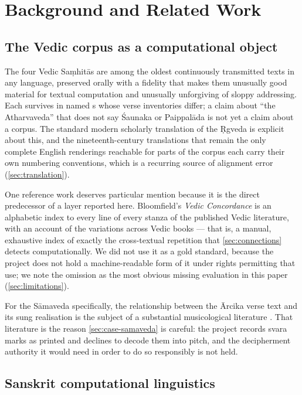 \section{Background and Related Work}
\label{sec:related}

\subsection{The Vedic corpus as a computational object}

The four Vedic Sa\d{m}hit\=as are among the oldest continuously transmitted texts in
any language, preserved orally with a fidelity that makes them unusually good
material for textual computation and unusually unforgiving of sloppy addressing. Each
survives in named s whose verse inventories differ; a claim about
``the Atharvaveda'' that does not say \'Saunaka or Paippal\=ada is not yet a claim
about a corpus. The standard modern scholarly translation of the \d{R}gveda
\citep{jamison2014rigveda} is explicit about this, and the nineteenth-century
translations that remain the only complete English renderings reachable for parts of
the corpus \citep{griffith1896rigveda,whitney1905atharva} each carry their own
numbering conventions, which is a recurring source of alignment error
(\cref{sec:translation}).

One reference work deserves particular mention because it is the direct predecessor
of a layer reported here. Bloomfield's \emph{Vedic Concordance}
\citep{bloomfield1906concordance} is an alphabetic index to every line of every
stanza of the published Vedic literature, with an account of the variations across
Vedic books --- that is, a manual, exhaustive index of exactly the cross-textual
repetition that \cref{sec:connections} detects computationally. We did not use it as
a gold standard, because the project does not hold a machine-readable form of it
under rights permitting that use; we note the omission as the most obvious missing
evaluation in this paper (\cref{sec:limitations}).

For the S\=amaveda specifically, the relationship between the \=Arcika verse text
and its sung realisation is the subject of a substantial musicological literature
\citep{howard1977samavedic}. That literature is the reason \cref{sec:case-samaveda}
is careful: the project records svara marks as printed and declines to decode them
into pitch, and the decipherment authority it would need in order to do so
responsibly is not held.

\subsection{Sanskrit computational linguistics}

